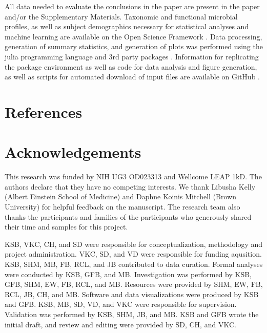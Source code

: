 \documentclass{article}
\begin{document}
All data needed to evaluate the conclusions in the paper
are present in the paper and/or the Supplementary Materials.
Taxonomic and functional microbial profiles, as well as subject
demographics necessary for statistical analyses and machine learning are
available on the Open Science Framework
\cite{bonhamECHORESONANCEMicrobiome2022}.
Data processing, generation of summary statistics, and
generation of plots was performed using the julia programming language
and 3rd party packages
\cite{bezansonJuliaFreshApproach2017,
    bonhamMicrobiomeJlBiobakeryUtils2021,
    danischMakieJlFlexible2021,
    blaomMLJJuliaPackage2020,
    ben_sadeghi_2022_7359268,
    dahua_lin_2023_7695673,
    douglas_bates_2023_7734970}.
Information for replicating the package environment
as well as code for data analysis and figure generation, as well as scripts for automated
download of input files are available on GitHub \cite{kevin_bonham_2023_7647510}.

\section*{References}

\printbibliography[heading=none]

\section*{Acknowledgements}

This research was funded by NIH UG3 OD023313 and Wellcome LEAP 1kD.
The authors declare that they have no competing interests.
We thank Libusha Kelly (Albert Einstein School of Medicine) and Daphne Koinis Mitchell (Brown University)
for helpful feedback on the manuscript. The research team also thanks the participants and families
of the participants who generously shared their time and samples for this project.


KSB, VKC, CH, and SD were responsible for conceptualization,
methodology and project administration.
VKC, SD, and VD were responsible for funding aqusition.
KSB, SHM, MB, FB, RCL, and JB contributed to data curation.
Formal analyses were conducted by KSB, GFB, and MB.
Investigation was performed by KSB, GFB, SHM, EW, FB, RCL, and MB.
Resources were provided by SHM, EW, FB, RCL, JB, CH, and MB.
Software and data visualizations were produced by KSB and GFB.
KSB, MB, SD, VD, and VKC were responsible for supervision.
Validation was performed by KSB, SHM, JB, and MB.
KSB and GFB wrote the initial draft, 
and review and editing were provided by SD, CH, and VKC.
\end{document}
